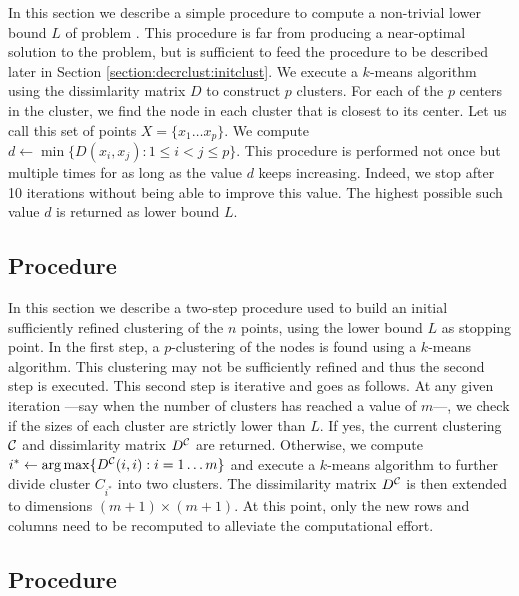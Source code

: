 \documentclass[ijoo,nonblindrev]{informs-ijoo}
\begin{document}
In this section we describe a simple procedure to compute a non-trivial lower bound $L$ of problem . This procedure is far from producing a near-optimal solution to the problem, but is sufficient to feed the procedure  to be described later in Section \ref{section:decrclust:initclust}. We execute a $k$-means algorithm using the dissimlarity matrix $D$ to construct $p$ clusters. For each of the $p$ centers in the cluster, we find the node in each cluster that is closest to its center. Let us call this set of points $X = \{x_1\ldots x_p\}$. We compute $d\leftarrow \min\{D(x_i, x_j): 1\leq i < j \leq p\}$. This procedure is performed not once but multiple times for as long as the value $d$ keeps increasing. Indeed, we stop after 10 iterations without being able to improve this value. The highest possible such value $d$ is returned as lower bound $L$.

\subsection{Procedure \label{section:decrclust:initclust}}

In this section we describe a two-step procedure used to build an initial sufficiently refined clustering of the $n$ points, using the lower bound $L$ as stopping point. In the first step, a $p$-clustering of the nodes is found using a $k$-means algorithm. This clustering may not be sufficiently refined and thus the second step is executed. This second step is iterative and goes as follows. At any given iteration ---say when the number of clusters has reached a value of $m$---, we check if the sizes of each cluster are strictly lower than $L$. If yes, the current clustering $\mathcal{C}$ and dissimlarity matrix $D^{\mathcal{C}}$ are returned. Otherwise, we compute $i^*\leftarrow\arg\max\{D^{\mathcal{C}}(i, i): i = 1\ldots m\}$ and execute a $k$-means algorithm to further divide cluster $C_{i^*}$ into two clusters. The dissimilarity matrix $D^{\mathcal{C}}$ is then extended to dimensions $(m + 1)\times (m + 1)$. At this point, only the new rows and columns need to be recomputed to alleviate the computational effort.

\subsection{Procedure \label{section:decrclust:splitadd}}
\end{document}
